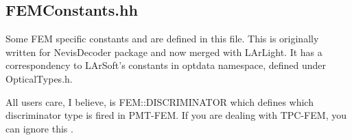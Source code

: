 \subsection{FEMConstants.hh}
Some FEM specific constants and \enum are defined in this file.
This is originally written for {\ttfamily NevisDecoder} package and now merged with LArLight.
It has a correspondency to LArSoft's constants in {\ttfamily optdata} namespace, defined under OpticalTypes.h.

All users care, I believe, is {\ttfamily FEM::DISCRIMINATOR} which defines which discriminator type
is fired in PMT-FEM. If you are dealing with TPC-FEM, you can ignore this \enum.





